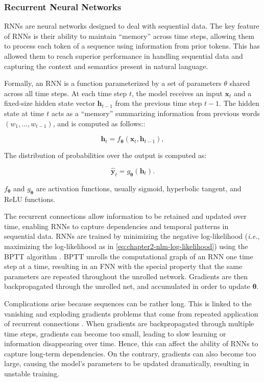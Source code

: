\subsubsection{Recurrent Neural Networks}

\acp{RNN} are neural networks designed to deal with sequential data. The key feature of \acp{RNN} is their ability to maintain “memory” across time steps, allowing them to process each token of a sequence using information from prior tokens. This has allowed them to reach superior performance in handling sequential data and capturing the context and semantics present in natural language.  

\noindent Formally, an \ac{RNN} is a function parameterized by a set of parameters $\theta$ shared across all time steps. At each time step $t$, the model receives an input $\bm{x}_t$ and a fixed-size hidden state vector $\bm{h}_{t-1}$ from the previous time step $t-1$. The hidden state at time $t$ acts as a “memory” summarizing information from previous words $(w_1, \ldots, w_{t-1})$, and is computed as follows::

\begin{equation}
    \bm{h}_{t} = f_{\bm{\theta}}(\bm{x}_t, \bm{h}_{t-1}),  
\end{equation}

The distribution of probabilities over the output is computed as:

\begin{equation}
    \hat{\bm{y}}_t = g_{\bm{\theta}}(\bm{h}_t).
\end{equation}

\noindent $f_{\bm{\theta}}$ and $g_{\bm{\theta}}$ are activation functions, usually sigmoid, hyperbolic tangent, and \ac{ReLU} functions.

The recurrent connections allow information to be retained and updated over time, enabling \acp{RNN} to capture dependencies and temporal patterns in sequential data. \acp{RNN} are trained by minimizing the negative log-likelihood (\textit{i.e.}, maximizing the log-likelihood as in \ref{eq:chapter2-nlm-log-likelihood}) using the \ac{BPTT} algorithm \citep{werbos1990backpropagation}. \ac{BPTT} unrolls the computational graph of an \ac{RNN} one time step at a time, resulting in an \ac{FNN} with the special property that the same parameters are repeated throughout the unrolled network. Gradients are then backpropagated through the unrolled net, and accumulated in order to update $\bm{\theta}$. 

Complications arise because sequences can be rather long. This is linked to the vanishing and exploding gradients problems that come from repeated application of recurrent connections \citep{hochreiter2001gradient}. When gradients are backpropagated through multiple time steps, gradients can become too small, leading to slow learning or information disappearing over time. Hence, this can affect the ability of \acp{RNN} to capture long-term dependencies. On the contrary, gradients can also become too large, causing the model's parameters to be updated dramatically, resulting in unstable training. 


